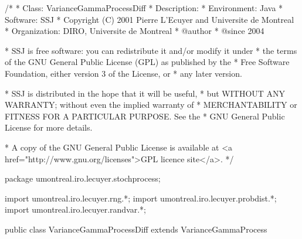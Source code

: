 \begin{code}
\begin{hide}
/*
 * Class:        VarianceGammaProcessDiff
 * Description:  
 * Environment:  Java
 * Software:     SSJ 
 * Copyright (C) 2001  Pierre L'Ecuyer and Universite de Montreal
 * Organization: DIRO, Universite de Montreal
 * @author       
 * @since        2004

 * SSJ is free software: you can redistribute it and/or modify it under
 * the terms of the GNU General Public License (GPL) as published by the
 * Free Software Foundation, either version 3 of the License, or
 * any later version.

 * SSJ is distributed in the hope that it will be useful,
 * but WITHOUT ANY WARRANTY; without even the implied warranty of
 * MERCHANTABILITY or FITNESS FOR A PARTICULAR PURPOSE.  See the
 * GNU General Public License for more details.

 * A copy of the GNU General Public License is available at
   <a href="http://www.gnu.org/licenses">GPL licence site</a>.
 */
\end{hide}
package umontreal.iro.lecuyer.stochprocess;\begin{hide}
import umontreal.iro.lecuyer.rng.*;
import umontreal.iro.lecuyer.probdist.*;
import umontreal.iro.lecuyer.randvar.*;

\end{hide}

public class VarianceGammaProcessDiff extends VarianceGammaProcess \begin{hide} {
    protected GammaProcess gpos;
    protected GammaProcess gneg;
    protected double       mup, mun,
                           nup, nun;
\end{hide}
\end{code}
